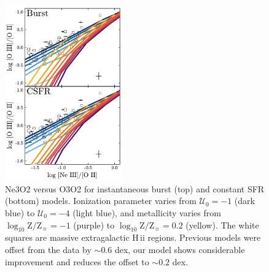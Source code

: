 \documentclass[linenumbers, tighten, trackchanges]{aastex61}%
\newcommand{\logten}{\ensuremath{\log_{10}}}
\newcommand{\hii}{H\,{\sc ii}\xspace}
\newcommand{\logZeq}[1]{\ensuremath{\logten \mathrm{Z}/\mathrm{Z}_{\sun} = #1}}
\newcommand{\U}{\ensuremath{\mathcal{U}_{0}}}
\begin{document}
\begin{figure}[!htbp]
  \begin{centering}
    \includegraphics[width=0.45\textwidth]{f20.pdf}
    \caption{Ne3O2 versus O3O2 for instantaneous burst (top) and constant SFR (bottom) models. Ionization parameter varies from $\U=-1$ (dark blue) to $\U=-4$ (light blue), and metallicity varies from \logZeq{-1} (purple) to \logZeq{0.2} (yellow). The white squares are massive extragalactic \hii regions. Previous models were offset from the data by $\sim 0.6$ dex, our model shows considerable improvement and reduces the offset to $\sim 0.2$ dex.}
    \label{fig:NeIII}
  \end{centering}
\end{figure}
\end{document}
